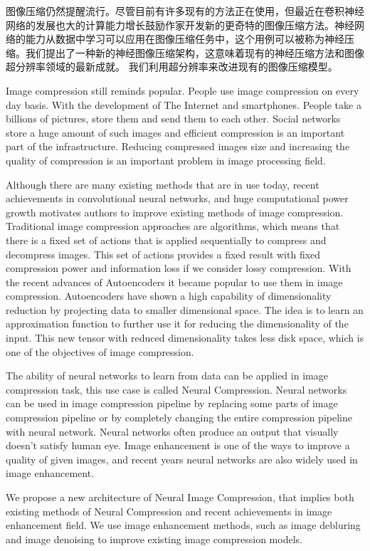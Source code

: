 
\begin{cabstract}
    图像压缩仍然提醒流行。尽管目前有许多现有的方法正在使用，但最近在卷积神经网络的发展也大的计算能力增长鼓励作家开发新的更奇特的图像压缩方法。神经网络的能力从数据中学习可以应用在图像压缩任务中，这个用例可以被称为神经压缩。我们提出了一种新的神经图像压缩架构，这意味着现有的神经压缩方法和图像超分辨率领域的最新成就。 我们利用超分辨率来改进现有的图像压缩模型。
\end{cabstract}

\begin{eabstract}

    Image compression still reminds popular. People use image compression on every day basis. With the development of The Internet and smartphones. People take a billions of pictures, store them and send them to each other. Social networks store a huge amount of such images and efficient compression is an important part of the infrastructure. Reducing compressed images size and increasing the quality of compression is an important problem in image processing field.

    Although there are many existing methods that are in use today, recent achievements in convolutional neural networks, and huge computational power growth motivates authors to improve existing methods of image compression. Traditional image compression approaches are algorithms, which means that there is a fixed set of actions that is applied sequentially to compress and decompress images. This set of actions provides a fixed result with fixed compression power and information loss if we consider lossy compression. With the recent advances of Autoencoders it became popular to use them in image compression. Autoencoders have shown a high capability of dimensionality reduction by projecting data to smaller dimensional space. The idea is to learn an approximation function to further use it for reducing the dimensionality of the input. This new tensor with reduced dimensionality takes less disk space, which is one of the objectives of image compression.

    The ability of neural networks to learn from data can be applied in image compression task, this use case is called Neural Compression. Neural networks can be used in image compression pipeline by replacing some parts of image compression pipeline or by completely changing the entire compression pipeline with neural network. Neural networks often produce an output that visually doesn't satisfy human eye. Image enhancement is one of the ways to improve a quality of given images, and recent years neural networks are also widely used in image enhancement.

    We propose a new architecture of Neural Image Compression, that implies both existing methods of  Neural Compression and recent achievements in image enhancement field. We use image enhancement methods, such as image debluring and image denoising to improve existing image compression models.

\end{eabstract}